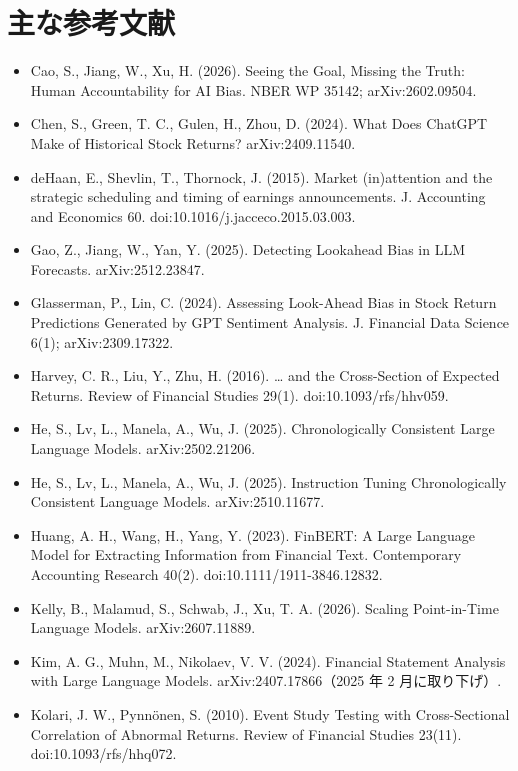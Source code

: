 \documentclass[xelatex,ja=standard,jafont=haranoaji,a4paper,10pt]{bxjsarticle}
\begin{document}
\section*{主な参考文献}
\begin{small}
\begin{itemize}[leftmargin=1.2em,itemsep=0.1em]
\item Cao, S., Jiang, W., Xu, H. (2026). Seeing the Goal, Missing the Truth: Human Accountability for AI Bias. NBER WP 35142; arXiv:2602.09504.
\item Chen, S., Green, T. C., Gulen, H., Zhou, D. (2024). What Does ChatGPT Make of Historical Stock Returns? arXiv:2409.11540.
\item deHaan, E., Shevlin, T., Thornock, J. (2015). Market (in)attention and the strategic scheduling and timing of earnings announcements. J. Accounting and Economics 60. doi:10.1016/j.jacceco.2015.03.003.
\item Gao, Z., Jiang, W., Yan, Y. (2025). Detecting Lookahead Bias in LLM Forecasts. arXiv:2512.23847.
\item Glasserman, P., Lin, C. (2024). Assessing Look-Ahead Bias in Stock Return Predictions Generated by GPT Sentiment Analysis. J. Financial Data Science 6(1); arXiv:2309.17322.
\item Harvey, C. R., Liu, Y., Zhu, H. (2016). … and the Cross-Section of Expected Returns. Review of Financial Studies 29(1). doi:10.1093/rfs/hhv059.
\item He, S., Lv, L., Manela, A., Wu, J. (2025). Chronologically Consistent Large Language Models. arXiv:2502.21206.
\item He, S., Lv, L., Manela, A., Wu, J. (2025). Instruction Tuning Chronologically Consistent Language Models. arXiv:2510.11677.
\item Huang, A. H., Wang, H., Yang, Y. (2023). FinBERT: A Large Language Model for Extracting Information from Financial Text. Contemporary Accounting Research 40(2). doi:10.1111/1911-3846.12832.
\item Kelly, B., Malamud, S., Schwab, J., Xu, T. A. (2026). Scaling Point-in-Time Language Models. arXiv:2607.11889.
\item Kim, A. G., Muhn, M., Nikolaev, V. V. (2024). Financial Statement Analysis with Large Language Models. arXiv:2407.17866（2025 年 2 月に取り下げ）.
\item Kolari, J. W., Pynnönen, S. (2010). Event Study Testing with Cross-Sectional Correlation of Abnormal Returns. Review of Financial Studies 23(11). doi:10.1093/rfs/hhq072.

\end{itemize}
\end{small}
\end{document}
